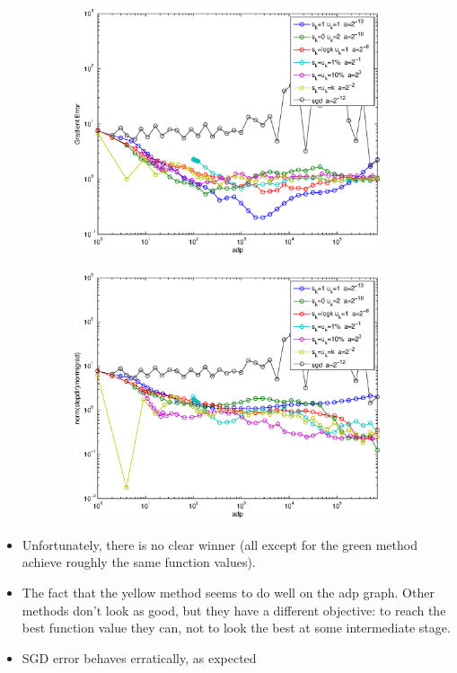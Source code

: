 \documentclass[12pt]{article}
\begin{document}
\begin{figure}[H]
	\begin{subfigure}[b]{.5\linewidth}
		        \includegraphics[width=4in]{Figures/whowins3.eps}
	\end{subfigure}%
	\begin{subfigure}[b]{.5\linewidth}
		        \includegraphics[width=4in]{Figures/whowins4.eps}
	\end{subfigure}%
	\end{figure}
	
	
	\begin{itemize}
		\item Unfortunately, there is no clear winner (all except for the green method achieve roughly the same function values).
		\item The fact that the yellow method seems to do well on the adp graph. Other methods don't look as good, but they have a different objective: to reach the best function value they can, not to look the best at some intermediate stage. 
		\item SGD error behaves erratically, as expected
	\end{itemize}
	
\end{document}
